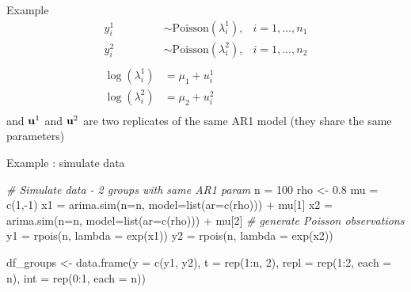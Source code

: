 \documentclass[
  ignorenonframetext,
]{beamer}
\newenvironment{Shaded}{\begin{snugshade}}{\end{snugshade}}
\newcommand{\AttributeTok}[1]{\textcolor[rgb]{0.77,0.63,0.00}{#1}}
\newcommand{\CommentTok}[1]{\textcolor[rgb]{0.56,0.35,0.01}{\textit{#1}}}
\newcommand{\DecValTok}[1]{\textcolor[rgb]{0.00,0.00,0.81}{#1}}
\newcommand{\FloatTok}[1]{\textcolor[rgb]{0.00,0.00,0.81}{#1}}
\newcommand{\FunctionTok}[1]{\textcolor[rgb]{0.00,0.00,0.00}{#1}}
\newcommand{\NormalTok}[1]{#1}
\newcommand{\OtherTok}[1]{\textcolor[rgb]{0.56,0.35,0.01}{#1}}
\newcommand{\SpecialCharTok}[1]{\textcolor[rgb]{0.00,0.00,0.00}{#1}}
\begin{document}
\begin{frame}{Example}
\protect\hypertarget{example}{}
\[
\begin{aligned}
y^1_i & \sim\text{Poisson}(\lambda^1_i), & i = 1,\dots,n_1\\
y^2_i & \sim\text{Poisson}(\lambda^2_i), & i = 1,\dots,n_2\\
\\
\log(\lambda^1_i) & = \mu_1 + u^1_i\\
\log(\lambda^2_i)  & = \mu_2 + u^2_i\\
\end{aligned}
\] and \({\bf u}^1\) and \({\bf u}^2\) are two replicates of the same
AR1 model (they share the same parameters)
\end{frame}

\begin{frame}[fragile]{Example : simulate data}
\protect\hypertarget{example-simulate-data}{}
\footnotesize

\begin{Shaded}
\begin{Highlighting}[]
\CommentTok{\# Simulate data {-} 2 groups with same AR1 param}
\NormalTok{n }\OtherTok{=} \DecValTok{100}
\NormalTok{rho }\OtherTok{\textless{}{-}} \FloatTok{0.8}
\NormalTok{mu }\OtherTok{=} \FunctionTok{c}\NormalTok{(}\DecValTok{1}\NormalTok{,}\SpecialCharTok{{-}}\DecValTok{1}\NormalTok{)}
\NormalTok{x1 }\OtherTok{=} \FunctionTok{arima.sim}\NormalTok{(}\AttributeTok{n=}\NormalTok{n, }\AttributeTok{model=}\FunctionTok{list}\NormalTok{(}\AttributeTok{ar=}\FunctionTok{c}\NormalTok{(rho))) }\SpecialCharTok{+}\NormalTok{ mu[}\DecValTok{1}\NormalTok{]}
\NormalTok{x2 }\OtherTok{=} \FunctionTok{arima.sim}\NormalTok{(}\AttributeTok{n=}\NormalTok{n, }\AttributeTok{model=}\FunctionTok{list}\NormalTok{(}\AttributeTok{ar=}\FunctionTok{c}\NormalTok{(rho))) }\SpecialCharTok{+}\NormalTok{ mu[}\DecValTok{2}\NormalTok{]}
\CommentTok{\# generate Poisson observations}
\NormalTok{y1 }\OtherTok{=} \FunctionTok{rpois}\NormalTok{(n, }\AttributeTok{lambda =} \FunctionTok{exp}\NormalTok{(x1))}
\NormalTok{y2 }\OtherTok{=} \FunctionTok{rpois}\NormalTok{(n, }\AttributeTok{lambda =} \FunctionTok{exp}\NormalTok{(x2))}

\NormalTok{df\_groups }\OtherTok{\textless{}{-}} \FunctionTok{data.frame}\NormalTok{(}\AttributeTok{y =} \FunctionTok{c}\NormalTok{(y1, y2),}
                        \AttributeTok{t =} \FunctionTok{rep}\NormalTok{(}\DecValTok{1}\SpecialCharTok{:}\NormalTok{n, }\DecValTok{2}\NormalTok{),}
                        \AttributeTok{repl =} \FunctionTok{rep}\NormalTok{(}\DecValTok{1}\SpecialCharTok{:}\DecValTok{2}\NormalTok{, }\AttributeTok{each =}\NormalTok{ n),}
                        \AttributeTok{int =} \FunctionTok{rep}\NormalTok{(}\DecValTok{0}\SpecialCharTok{:}\DecValTok{1}\NormalTok{, }\AttributeTok{each =}\NormalTok{ n))}
\end{Highlighting}
\end{Shaded}
\end{frame}
\end{document}
